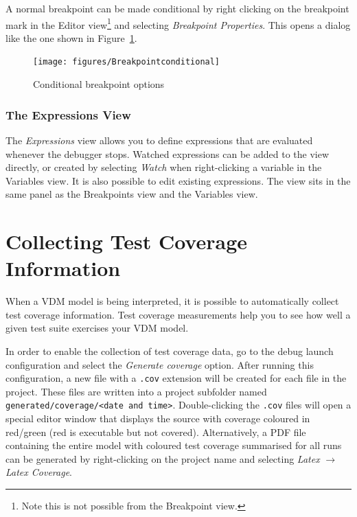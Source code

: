 \documentclass{overturerepchap}
\begin{document}
A normal breakpoint can be made conditional by right clicking on the breakpoint
mark in the Editor view\footnote{Note this is not possible from the Breakpoint view.}
and selecting \emph{Breakpoint Properties}. This opens a dialog like the one shown in
Figure~\ref{fig:userguide:BreakpointConditional}.

\begin{figure}[htp]
\begin{center}
  \texttt{[image: figures/Breakpointconditional]}
  \caption{Conditional breakpoint options}
  \label{fig:userguide:BreakpointConditional}
\end{center}
\end{figure}

\subsection{The Expressions View}

The \emph{Expressions} view allows you to define expressions that are evaluated
whenever the debugger stops.
Watched expressions can be added to the view directly, or created by selecting \emph{Watch}
when right-clicking a variable in the Variables view. It is also possible to edit existing
expressions. The view sits in the same panel as the Breakpoints view and
the Variables view.

\chapter{Collecting Test Coverage Information}\label{sec:testcoverage}

When a VDM model is being interpreted, it is possible to automatically collect
test coverage information. Test coverage measurements help you to see how well a
given test suite exercises your VDM model.

In order to enable the collection of test coverage data, go to the debug launch
configuration and select the \emph{Generate coverage} option. After
running this configuration, a new file with a \texttt{.cov} extension will be created for
each file in the project. These files are written into a project subfolder named
\texttt{generated/coverage/<date and time>}. Double-clicking the \texttt{.cov} files
will open a special editor window that displays the source with coverage
coloured in red/green (red is executable but not covered). Alternatively, a PDF file
containing the entire model with coloured test coverage summarised for all runs
can be generated
by right-clicking on the project name and selecting \emph{Latex} $\rightarrow$
\emph{Latex Coverage}.
\end{document}
